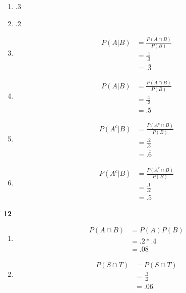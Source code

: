 \documentclass[12pt]{report}
\begin{document}
                 \begin{enumerate}[label={\bf \alph*}]
                 \item .3                   
                 \item .2
                 \item
                   \begin{align*}
                     P(A|B)&=\frac{P(A\cap B)}{P(B)}\\
                       &=\frac{.1}{.3}\\
                       &=.\bar{3}
                   \end{align*}
                 \item
                   
                   \begin{align*}
                     P(A|B)&=\frac{P(A\cap B)}{P(B)}\\
                       &=\frac{.1}{.2}\\
                       &=.5
                   \end{align*}
                 \item
                   \begin{align*}
                     P(A^c|B)&=\frac{P(A^c\cap B)}{P(B)}\\
                     &=\frac{.2}{.3}\\
                       &=.\bar{6}
                   \end{align*}
                 \item
                   \begin{align*}       
                     P(A^c|B)&=\frac{P(A^c\cap B)}{P(B)}\\
                     &=\frac{.1}{.2}\\
                     &=.5
                   \end{align*}
                 \end{enumerate}
                 {\bf 12}
                 \begin{enumerate}[label={\bf \alph*}]
                 \item 
                 \begin{align*}
                   P(A \cap B) &= P(A)P(B)\\
                   &=.2*.4\\
                   &=.08
                 \end{align*}
               \item
                 \begin{align*}
                   P(S\cap T)&={P(S \cap T)}\\
                   &=\frac{.3}{.2}\\
                   &=.06
                 \end{align*}
                 \end{enumerate}
\end{document}
